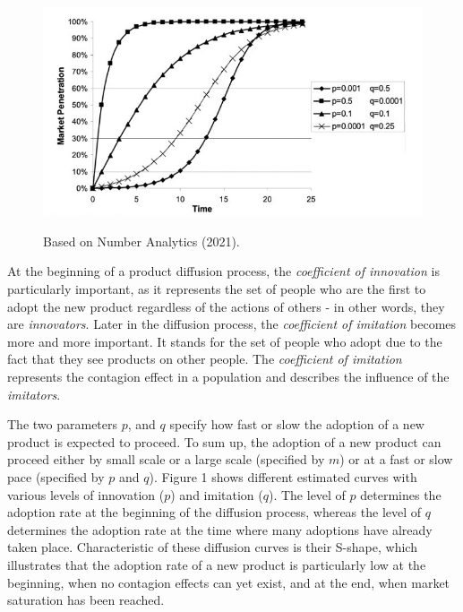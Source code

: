 \documentclass{article}
\begin{document}
\begin{figure}[hptb]
    \centering{}\includegraphics[scale=0.5]{plots_preliminary/bass_model_example.png}\\
    \caption{Based on Number Analytics (2021).}
\end{figure}

\noindent At the beginning of a product diffusion process, the \emph{coefficient of innovation} is particularly important, as it represents the set of
people who are the first to adopt the new product regardless of the actions of others - in other words, they are \emph{innovators}. Later in the diffusion
process, the \emph{coefficient of imitation} becomes more and more important. It stands for the set of people who adopt due to the fact that they see
products on other people. The \emph{coefficient of imitation} represents the contagion effect in a population and describes the influence of the \emph{imitators}.

\medskip

\noindent The two parameters $p$, and $q$ specify how fast or slow the adoption of a new product is expected to proceed. To sum up, the adoption of a
new product can proceed either by small scale or a large scale (specified by $m$) or at a fast or slow pace (specified by $p$ and $q$). 
Figure 1 shows different estimated curves with various levels of innovation ($p$) and imitation ($q$). The level of $p$ determines the adoption rate at
the beginning of the diffusion process, whereas the level of $q$ determines the adoption rate at the time where many adoptions have already taken place.
Characteristic of these diffusion curves is their S-shape, which illustrates that the adoption rate of a new product is particularly low at the beginning,
when no contagion effects can yet exist, and at the end, when market saturation has been reached. 
\end{document}
